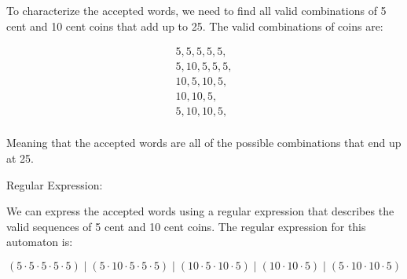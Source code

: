 \documentclass{article}
\theoremstyle{theorem}
\theoremstyle{definition}
\theoremstyle{remark}
\begin{document}



To characterize the accepted words, we need to find all valid combinations of 5 cent and 10 cent coins that add up to 25. The valid combinations of coins are:

\[
\begin{aligned}
    5, 5, 5, 5, 5, \\
    5, 10, 5, 5, 5, \\
    10, 5, 10, 5, \\
    10, 10, 5, \\
    5, 10, 10, 5, \\
\end{aligned}
\]


Meaning that the accepted words are all of the possible combinations that end up at 25.

Regular Expression:

We can express the accepted words using a regular expression that describes the valid sequences of 5 cent and 10 cent coins. The regular expression for this automaton is:

\[
(5 \cdot 5 \cdot 5 \cdot 5 \cdot 5) \mid (5 \cdot 10 \cdot 5 \cdot 5 \cdot 5) \mid (10 \cdot 5 \cdot 10 \cdot 5) \mid (10 \cdot 10 \cdot 5) \mid (5 \cdot 10 \cdot 10 \cdot 5)
\]
\end{document}
